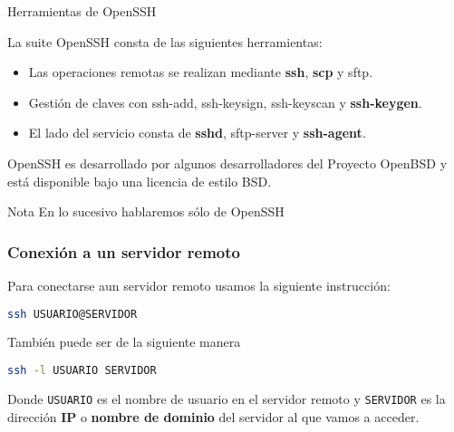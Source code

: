 \begin{frame}[c]{Herramientas de OpenSSH}

  La suite OpenSSH consta de las siguientes herramientas:

  \begin{itemize}
    \item Las operaciones remotas se realizan mediante \textbf{ssh},
      \textbf{scp} y sftp.
    \pausa
    \item Gestión de claves con ssh-add, ssh-keysign, ssh-keyscan
      y \textbf{ssh-keygen}.
    \pausa
    \item El lado del servicio consta de \textbf{sshd}, sftp-server
      y \textbf{ssh-agent}.
  \end{itemize}

  \pausa
  \vspace{\baselineskip}
  OpenSSH es desarrollado por algunos desarrolladores del Proyecto OpenBSD
  y está disponible bajo una licencia de estilo BSD. 

  \vspace{\baselineskip}
  \begin{exampleblock}{Nota}
    En lo sucesivo hablaremos sólo de OpenSSH
  \end{exampleblock}
\end{frame}

\begin{frame}[fragile]
  \frametitle{Conexión a un servidor remoto}

  Para conectarse aun servidor remoto usamos la siguiente instrucción:

  \vspace{\baselineskip}
  \begin{lstlisting}[language=Bash]
ssh USUARIO@SERVIDOR
  \end{lstlisting}

  \pausa
  \vspace{\baselineskip}
  También puede ser de la siguiente manera

  \vspace{\baselineskip}
  \begin{lstlisting}[language=Bash]
ssh -l USUARIO SERVIDOR
  \end{lstlisting}

  \vspace{\baselineskip}
  Donde \texttt{USUARIO} es el nombre de usuario en el servidor remoto y
  \texttt{SERVIDOR} es la dirección \textbf{IP} o \textbf{nombre de dominio}
  del servidor al que vamos a acceder.
\end{frame}

